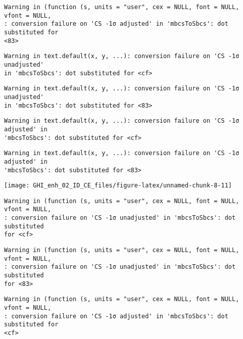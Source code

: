 \documentclass[
  10pt,
  a4paper,oneside]{article}
\begin{document}
\begin{verbatim}
Warning in (function (s, units = "user", cex = NULL, font = NULL, vfont = NULL,
: conversion failure on 'CS -1σ adjusted' in 'mbcsToSbcs': dot substituted for
<83>
\end{verbatim}

\begin{verbatim}
Warning in text.default(x, y, ...): conversion failure on 'CS -1σ unadjusted'
in 'mbcsToSbcs': dot substituted for <cf>
\end{verbatim}

\begin{verbatim}
Warning in text.default(x, y, ...): conversion failure on 'CS -1σ unadjusted'
in 'mbcsToSbcs': dot substituted for <83>
\end{verbatim}

\begin{verbatim}
Warning in text.default(x, y, ...): conversion failure on 'CS -1σ adjusted' in
'mbcsToSbcs': dot substituted for <cf>
\end{verbatim}

\begin{verbatim}
Warning in text.default(x, y, ...): conversion failure on 'CS -1σ adjusted' in
'mbcsToSbcs': dot substituted for <83>
\end{verbatim}

\begin{center}\texttt{[image: GHI\_enh\_02\_ID\_CE\_files/figure-latex/unnamed-chunk-8-11]} \end{center}

\begin{verbatim}
Warning in (function (s, units = "user", cex = NULL, font = NULL, vfont = NULL,
: conversion failure on 'CS -1σ unadjusted' in 'mbcsToSbcs': dot substituted
for <cf>
\end{verbatim}

\begin{verbatim}
Warning in (function (s, units = "user", cex = NULL, font = NULL, vfont = NULL,
: conversion failure on 'CS -1σ unadjusted' in 'mbcsToSbcs': dot substituted
for <83>
\end{verbatim}

\begin{verbatim}
Warning in (function (s, units = "user", cex = NULL, font = NULL, vfont = NULL,
: conversion failure on 'CS -1σ adjusted' in 'mbcsToSbcs': dot substituted for
<cf>
\end{verbatim}
\end{document}
